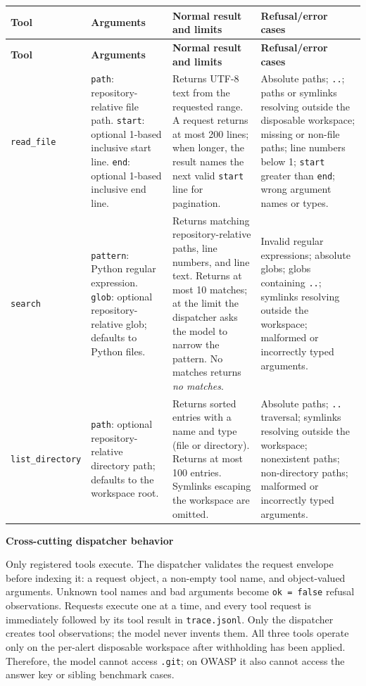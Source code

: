 \documentclass[11pt]{article}
\begin{document}
{\small
\renewcommand{\arraystretch}{1.25}
\setlength{\tabcolsep}{3pt}
\begin{longtable}{@{}>{\raggedright\arraybackslash}p{} >{\raggedright\arraybackslash}p{} >{\raggedright\arraybackslash}p{} >{\raggedright\arraybackslash}p{}@{}}
\toprule
\textbf{Tool} & \textbf{Arguments} & \textbf{Normal result and limits} & \textbf{Refusal/error cases} \\
\midrule
\endfirsthead
\toprule
\textbf{Tool} & \textbf{Arguments} & \textbf{Normal result and limits} & \textbf{Refusal/error cases} \\
\midrule
\endhead
\texttt{read\_file} & \texttt{path}: repository-relative file path. \texttt{start}: optional 1-based inclusive start line. \texttt{end}: optional 1-based inclusive end line. & Returns UTF-8 text from the requested range. A request returns at most 200 lines; when longer, the result names the next valid \texttt{start} line for pagination. & Absolute paths; \texttt{..}; paths or symlinks resolving outside the disposable workspace; missing or non-file paths; line numbers below 1; \texttt{start} greater than \texttt{end}; wrong argument names or types. \\ \midrule
\texttt{search} & \texttt{pattern}: Python regular expression. \texttt{glob}: optional repository-relative glob; defaults to Python files. & Returns matching repository-relative paths, line numbers, and line text. Returns at most 10 matches; at the limit the dispatcher asks the model to narrow the pattern. No matches returns \emph{no matches}. & Invalid regular expressions; absolute globs; globs containing \texttt{..}; symlinks resolving outside the workspace; malformed or incorrectly typed arguments. \\ \midrule
\texttt{list\_}\newline\texttt{directory} & \texttt{path}: optional repository-relative directory path; defaults to the workspace root. & Returns sorted entries with a name and type (file or directory). Returns at most 100 entries. Symlinks escaping the workspace are omitted. & Absolute paths; \texttt{..} traversal; symlinks resolving outside the workspace; nonexistent paths; non-directory paths; malformed or incorrectly typed arguments. \\
\bottomrule
\end{longtable}
}

\medskip
\noindent\textbf{Cross-cutting dispatcher behavior}\par\smallskip
\noindent Only registered tools execute. The dispatcher validates the request envelope before indexing it: a request object, a non-empty tool name, and object-valued arguments. Unknown tool names and bad arguments become \texttt{ok = false} refusal observations. Requests execute one at a time, and every tool request is immediately followed by its tool result in \texttt{trace.jsonl}. Only the dispatcher creates tool observations; the model never invents them. All three tools operate only on the per-alert disposable workspace after withholding has been applied. Therefore, the model cannot access \texttt{.git}; on OWASP it also cannot access the answer key or sibling benchmark cases.
\end{document}
